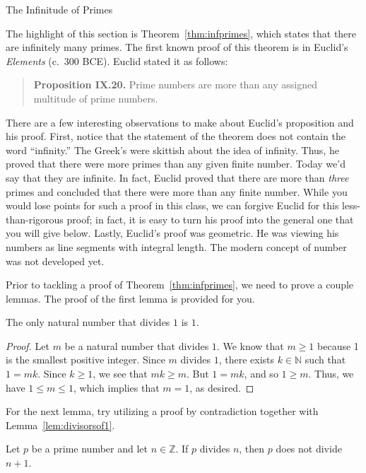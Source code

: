 \begin{section}{The Infinitude of Primes}

The highlight of this section is Theorem~\ref{thm:infprimes}, which states that there are infinitely many primes. The first known proof of this theorem is in Euclid's \emph{Elements} (c.\ 300 BCE). Euclid stated it as follows: 
\begin{quote}
\textbf{Proposition IX.20.} Prime numbers are more than any assigned multitude of prime numbers.
\end{quote}
There are a few interesting observations to make about Euclid's proposition and his proof. First, notice that the statement of the theorem does not contain the word ``infinity.'' The Greek's were skittish about the idea of infinity. Thus, he proved that there were more primes than any given finite number. Today we'd say that they are infinite. In fact, Euclid proved that there are more than \emph{three} primes and concluded that there were more than any finite number. While you would lose points for such a proof in this class, we can forgive Euclid for this less-than-rigorous proof;  in fact, it is easy to turn his proof into the general one that you will give below. Lastly, Euclid's proof was geometric. He was viewing his numbers as line segments with integral length. The modern concept of number was not developed yet.

Prior to tackling a proof of Theorem~\ref{thm:infprimes}, we need to prove a couple lemmas.  The proof of the first lemma is provided for you. 

\begin{lemma}\label{lem:divisorsof1}
The only natural number that divides $1$ is $1$.  
\end{lemma}

\begin{proof}
Let $m$ be a natural number that divides $1$. We know that $m\geq 1$ because 1 is the smallest positive integer. Since $m$ divides $1$, there exists $k\in \mathbb{N}$ such that $1=mk$. Since $k\geq 1$, we see that $mk\geq m$.  But $1=mk$, and so $1\geq m$.  Thus, we have $1\leq m \leq 1$, which implies that $m=1$, as desired.
\end{proof}

For the next lemma, try utilizing a proof by contradiction together with Lemma~\ref{lem:divisorsof1}.

\begin{lemma}\label{lem:plus1}
Let $p$ be a prime number and let $n\in \mathbb{Z}$. If $p$ divides $n$, then $p$ does not divide $n+1$.
\end{lemma}


\end{section}
